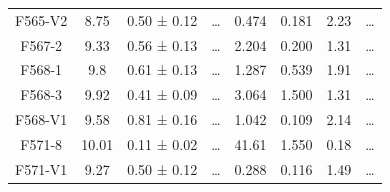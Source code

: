\documentclass[reprint,%
 amsmath,amssymb,
 aps,
]{revtex4-1}
\begin{document}
\begin{table}[]
\begin{tabular}{cccccrrc}
\rowcolor[HTML]{F3F3F3} 
F565-V2              & 8.75                      & 0.50 ± 0.12           & …                      & 0.474                                                        & 0.181                                                        & 2.23                                                           & …                                                             \\
\rowcolor[HTML]{F3F3F3} 
F567-2               & 9.33                      & 0.56 ± 0.13           & …                      & 2.204                                                        & 0.200                                                       & 1.31                                                           & …                                                             \\
\rowcolor[HTML]{F3F3F3} 
F568-1               & 9.8                       & 0.61 ± 0.13           & …                      & 1.287                                                        & 0.539                                                        & 1.91                                                            & …                                                             \\
\rowcolor[HTML]{F3F3F3} 
F568-3               & 9.92                      & 0.41 ± 0.09           & …                      & 3.064                                                        & 1.500                                                          & 1.31                                                           & …                                                             \\
\rowcolor[HTML]{F3F3F3} 
F568-V1              & 9.58                      & 0.81 ± 0.16           & …                      & 1.042                                                        & 0.109                                                         & 2.14                                                           & …                                                             \\
\rowcolor[HTML]{F3F3F3} 
F571-8               & 10.01                     & 0.11 ± 0.02           & …                      & 41.61                                                        & 1.550                                                        & 0.18                                                          & …                                                             \\
\rowcolor[HTML]{F3F3F3} 
F571-V1              & 9.27                      & 0.50 ± 0.12           & …                      & 0.288                                                        & 0.116                                                          & 1.49                                                         & …                                                             \\

\end{tabular}
\end{table}
\end{document}
